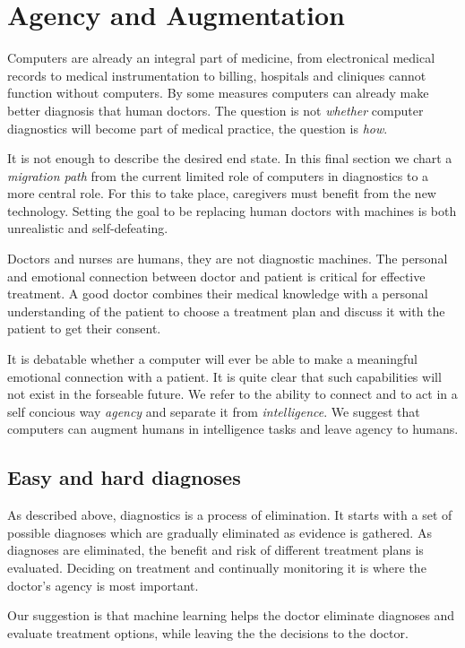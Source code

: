 \documentclass[9pt,twocolumn,twoside]{pnas-new}
\begin{document}
  \section*{Agency and Augmentation}

  Computers are already an integral part of medicine, from
  electronical medical records to medical instrumentation to billing,
  hospitals and cliniques cannot function without computers. By some
  measures computers can already make better diagnosis that human
  doctors. The question is not {\em whether} computer diagnostics will
  become part of medical practice, the question is {\em how}.

  It is not enough to describe the desired end state. 
  In this final section we chart a {\em migration path} from the
  current limited role of computers in diagnostics to a
  more central role. For this to take place, caregivers must benefit
  from the new technology. Setting the goal to be replacing human
  doctors with machines is both unrealistic and self-defeating.

  Doctors and nurses are humans, they are not diagnostic machines. The
  personal and emotional connection between doctor and patient is
  critical for effective treatment. A good doctor combines their
  medical knowledge with a personal understanding of the patient to
  choose a treatment plan and discuss it with the patient to get their
  consent.

  It is debatable whether a computer will ever be able to
  make a meaningful emotional connection with a patient. It is quite
  clear that such capabilities will not exist in the forseable future.
  We refer to the ability to connect and to act in a self concious
  way {\em agency} and separate it from {\em intelligence}. We suggest
  that computers can augment humans in intelligence tasks and leave
  agency to humans.

  \subsection*{Easy and hard diagnoses}

  As described above, diagnostics is a process of elimination. It
  starts with a set of possible diagnoses which are gradually
  eliminated as evidence is  gathered. As diagnoses are
  eliminated, the benefit and risk of different treatment plans is evaluated.
  Deciding on treatment and continually monitoring it is where the
  doctor's agency is most important.

  Our suggestion is that machine learning helps the doctor eliminate
  diagnoses and evaluate treatment options, while leaving the the
  decisions to the doctor.
\end{document}
